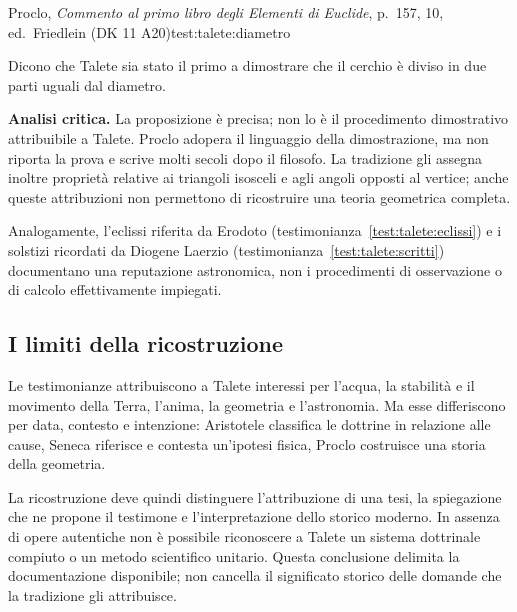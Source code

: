 \begin{testimonianza}{Proclo, \emph{Commento al primo libro degli Elementi di Euclide}, p.~157, 10, ed.\ Friedlein (DK 11 A20)}{test:talete:diametro}
\smallskip
{}\par
Dicono che Talete sia stato il primo a dimostrare che il cerchio è diviso in due parti uguali dal diametro.
\end{testimonianza}


\noindent\textbf{Analisi critica.}
La proposizione è precisa; non lo è il procedimento dimostrativo attribuibile a Talete. Proclo adopera il linguaggio della dimostrazione, ma non riporta la prova e scrive molti secoli dopo il filosofo. La tradizione gli assegna inoltre proprietà relative ai triangoli isosceli e agli angoli opposti al vertice; anche queste attribuzioni non permettono di ricostruire una teoria geometrica completa.

Analogamente, l'eclissi riferita da Erodoto (testimonianza~\ref{test:talete:eclissi}) e i solstizi ricordati da Diogene Laerzio (testimonianza~\ref{test:talete:scritti}) documentano una reputazione astronomica, non i procedimenti di osservazione o di calcolo effettivamente impiegati.

\subsection{I limiti della ricostruzione}

Le testimonianze attribuiscono a Talete interessi per l'acqua, la stabilità e il movimento della Terra, l'anima, la geometria e l'astronomia. Ma esse differiscono per data, contesto e intenzione: Aristotele classifica le dottrine in relazione alle cause, Seneca riferisce e contesta un'ipotesi fisica, Proclo costruisce una storia della geometria.

La ricostruzione deve quindi distinguere l'attribuzione di una tesi, la spiegazione che ne propone il testimone e l'interpretazione dello storico moderno. In assenza di opere autentiche non è possibile riconoscere a Talete un sistema dottrinale compiuto o un metodo scientifico unitario. Questa conclusione delimita la documentazione disponibile; non cancella il significato storico delle domande che la tradizione gli attribuisce.

